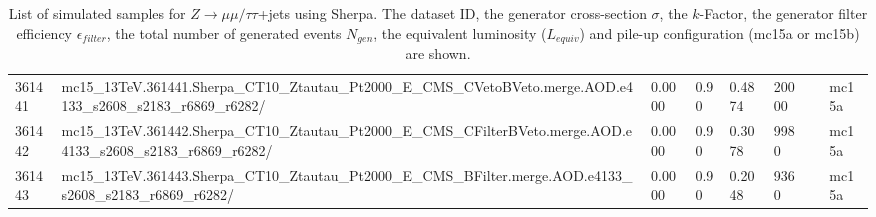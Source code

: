 \begin{sidewaystable}[!htp]
\begin{center}
{\begin{tabular}{llllllll}
361441  &  mc15\_13TeV.361441.Sherpa\_CT10\_Ztautau\_Pt2000\_E\_CMS\_CVetoBVeto.merge.AOD.e4133\_s2608\_s2183\_r6869\_r6282/  &  0.0000  &  0.90  &  0.4874  &  20000  &   &  mc15a \\
361442  &  mc15\_13TeV.361442.Sherpa\_CT10\_Ztautau\_Pt2000\_E\_CMS\_CFilterBVeto.merge.AOD.e4133\_s2608\_s2183\_r6869\_r6282/  &  0.0000  &  0.90  &  0.3078  &  9980  &   &  mc15a \\
361443  &  mc15\_13TeV.361443.Sherpa\_CT10\_Ztautau\_Pt2000\_E\_CMS\_BFilter.merge.AOD.e4133\_s2608\_s2183\_r6869\_r6282/  &  0.0000  &  0.90  &  0.2048  &  9360  &   &  mc15a \\
\hline
\end{tabular}}
\end{center}
\caption{List of simulated samples for
   $Z\to\mu\mu/\tau\tau$+jets using Sherpa. The dataset ID, the generator
  cross-section $\sigma$, the $k$-Factor, the generator filter
  efficiency $\epsilon_{filter}$, the total number of
  generated events $N_{gen}$, the equivalent luminosity ($L_{equiv}$) and pile-up configuration (mc15a or mc15b) are shown.}
\label{tab:BGSamples22}
\end{sidewaystable}
 

